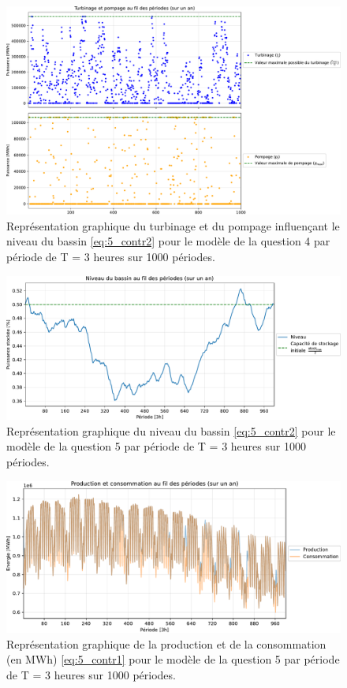 \documentclass{article}
\begin{document}
\begin{figure}[H]
    \centering
    \includegraphics[scale=0.6]{GraphesP2/Turbinage_pompage_Q5.pdf}
    \caption{Représentation graphique du turbinage et du pompage
    influençant le niveau du bassin \eqref{eq:5_contr2} pour le modèle de la question 4 par période de T = 3 heures sur 1000 périodes.}
    \label{fig:Turbinage_pompage_Q5}
\end{figure}

\begin{figure}[H]
    \centering
    \includegraphics[scale=0.6]{GraphesP2/Niveau_Bassin_Q5.pdf}
    \caption{Représentation graphique du niveau du bassin \eqref{eq:5_contr2} pour le modèle 
    de la question 5 par période de T = 3 heures sur 1000 périodes.}
    \label{fig:Niveau_bassin_Q5}
\end{figure}

\begin{figure}[H]
    \centering
    \includegraphics[scale=0.6]{GraphesP2/Prod_Cons_Q5.pdf}
    \caption{Représentation graphique de la production et de la consommation (en MWh) 
    \eqref{eq:5_contr1} pour le modèle de la question 5 par période de T = 3 heures sur 1000 périodes.}
    \label{fig:Prod_Cons_Q5}
\end{figure}
\end{document}
